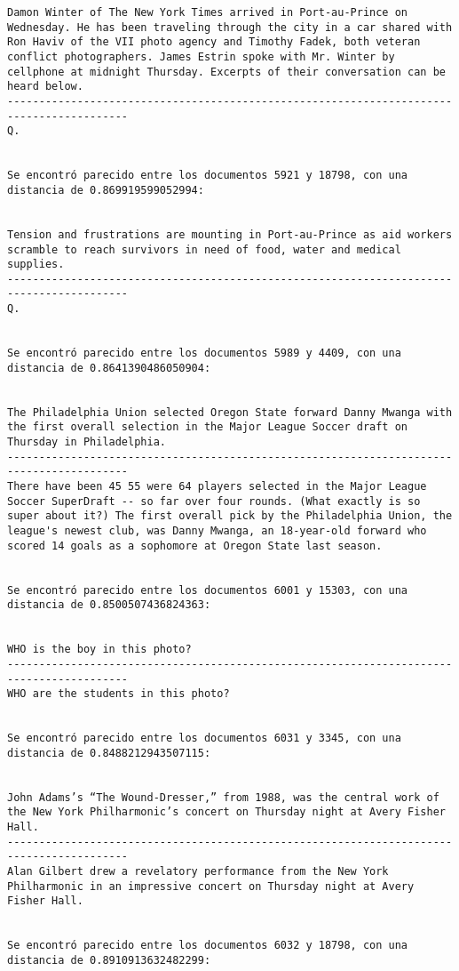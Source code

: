 \documentclass[11pt]{article}
\begin{document}
\begin{Verbatim}[commandchars=\\\{\}]
Damon Winter of The New York Times arrived in Port-au-Prince on Wednesday. He has been traveling through the city in a car shared with Ron Haviv of the VII photo agency and Timothy Fadek, both veteran conflict photographers. James Estrin spoke with Mr. Winter by cellphone at midnight Thursday. Excerpts of their conversation can be heard below.
-----------------------------------------------------------------------------------------
Q.


Se encontró parecido entre los documentos 5921 y 18798, con una distancia de 0.869919599052994:


Tension and frustrations are mounting in Port-au-Prince as aid workers scramble to reach survivors in need of food, water and medical supplies.
-----------------------------------------------------------------------------------------
Q.


Se encontró parecido entre los documentos 5989 y 4409, con una distancia de 0.8641390486050904:


The Philadelphia Union selected Oregon State forward Danny Mwanga with the first overall selection in the Major League Soccer draft on Thursday in Philadelphia.
-----------------------------------------------------------------------------------------
There have been 45 55 were 64 players selected in the Major League Soccer SuperDraft -- so far over four rounds. (What exactly is so super about it?) The first overall pick by the Philadelphia Union, the league's newest club, was Danny Mwanga, an 18-year-old forward who scored 14 goals as a sophomore at Oregon State last season.


Se encontró parecido entre los documentos 6001 y 15303, con una distancia de 0.8500507436824363:


WHO is the boy in this photo?
-----------------------------------------------------------------------------------------
WHO are the students in this photo?


Se encontró parecido entre los documentos 6031 y 3345, con una distancia de 0.8488212943507115:


John Adams’s “The Wound-Dresser,” from 1988, was the central work of the New York Philharmonic’s concert on Thursday night at Avery Fisher Hall.
-----------------------------------------------------------------------------------------
Alan Gilbert drew a revelatory performance from the New York Philharmonic in an impressive concert on Thursday night at Avery Fisher Hall.


Se encontró parecido entre los documentos 6032 y 18798, con una distancia de 0.8910913632482299:



\end{Verbatim}
\end{document}
